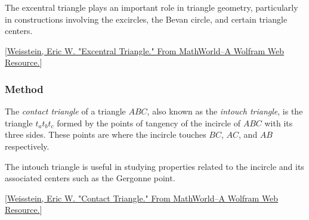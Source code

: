 The excentral triangle plays an important role in triangle geometry, particularly in constructions involving the excircles, the Bevan circle, and certain triangle centers.

\begin{flushright}
  \small
[\href{https://mathworld.wolfram.com/ExcentralTriangle.html}{Weisstein, Eric W. "Excentral Triangle." From MathWorld--A Wolfram Web Resource.}]
\end{flushright}

\vspace{1em}

\begin{tkzexample}[latex=.5\textwidth]
\end{tkzexample}




\subsubsection{Method } %
\label{ssub:method_triangle_intouch}

The \emph{contact triangle} of a triangle $ABC$, also known as the \emph{intouch triangle}, is the triangle $t_at_bt_c$ formed by the points of tangency of the incircle of $ABC$ with its three sides. These points are where the incircle touches $BC$, $AC$, and $AB$ respectively.

The intouch triangle is useful in studying properties related to the incircle and its associated centers such as the Gergonne point.

\begin{flushright}
  \small
[\href{https://mathworld.wolfram.com/ContactTriangle.html}{Weisstein, Eric W. "Contact Triangle." From MathWorld--A Wolfram Web Resource.}]
\end{flushright}

